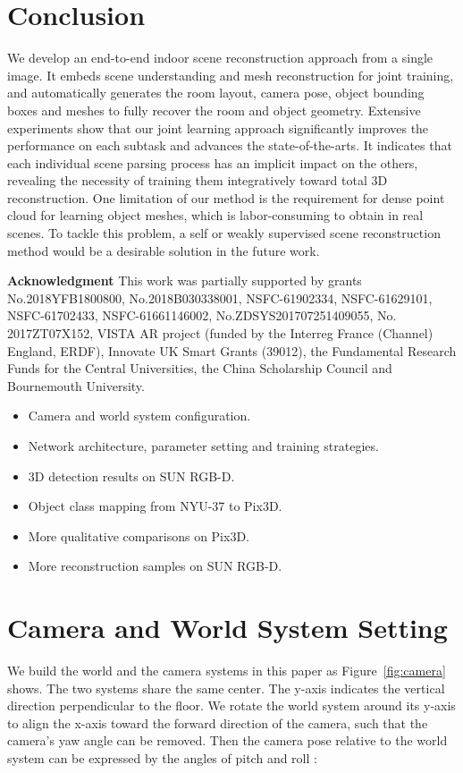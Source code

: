 \documentclass[10pt,twocolumn,letterpaper]{article}
\begin{document}
\section{Conclusion}
We develop an end-to-end indoor scene reconstruction approach from a single image. It embeds scene understanding and mesh reconstruction for joint training, and automatically generates the room layout, camera pose, object bounding boxes and meshes to fully recover the room and object geometry. Extensive experiments show that our joint learning approach significantly improves the performance on each subtask and advances the state-of-the-arts. It indicates that each individual scene parsing process has an implicit impact on the others, revealing the necessity of training them integratively toward total 3D reconstruction. One limitation of our method is the requirement for dense point cloud for learning object meshes, which is labor-consuming to obtain in real scenes. To tackle this problem, a self or weakly supervised scene reconstruction method would be a desirable solution in the future work.

\noindent\textbf{Acknowledgment} This work was partially supported by grants No.2018YFB1800800, No.2018B030338001, NSFC-61902334, NSFC-61629101, NSFC-61702433, NSFC-61661146002, No.ZDSYS201707251409055, No. 2017ZT07X152, VISTA AR project (funded by the Interreg France (Channel) England, ERDF), Innovate UK Smart Grants (39012), the Fundamental Research Funds for the Central Universities, the China Scholarship Council and Bournemouth University.

{\small


}


\appendix
{}
\begin{itemize}
	\item Camera and world system configuration.
	\item Network architecture, parameter setting and training strategies.
	\item 3D detection results on SUN RGB-D.
	\item Object class mapping from NYU-37 to Pix3D.
	\item More qualitative comparisons on Pix3D.
	\item More reconstruction samples on SUN RGB-D.
\end{itemize}
\section{Camera and World System Setting}
We build the world and the camera systems in this paper as Figure~\ref{fig:camera} shows. The two systems share the same center. The y-axis indicates the vertical direction perpendicular to the floor. We rotate the world system around its y-axis to align the x-axis toward the forward direction of the camera, such that the camera's yaw angle can be removed. Then the camera pose relative to the world system can be expressed by the angles of pitch  and roll :
\end{document}
